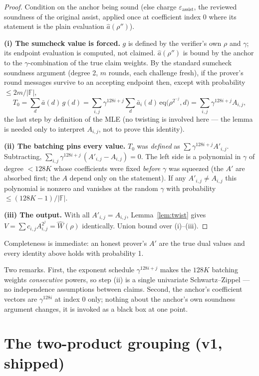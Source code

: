 \documentclass[11pt]{article}
\newcommand{\F}{\mathbb{F}}
\newcommand{\eq}{\mathrm{eq}}
\begin{document}
\begin{proof}
Condition on the anchor being sound (else charge
$\varepsilon_{\mathrm{assist}}$, the reviewed soundness of the original
assist, applied once at coefficient index $0$ where its statement is the
plain evaluation $\hat a(\rho'')$).

\textbf{(i) The sumcheck value is forced.} $g$ is defined by the verifier's
own $\rho$ and $\gamma$; its endpoint evaluation is computed, not claimed.
$\hat a(\rho'')$ is bound by the anchor to the $\gamma$-combination of the
true claim weights. By the standard sumcheck soundness argument (degree 2,
$m$ rounds, each challenge fresh), if the prover's round messages survive to
an accepting endpoint then, except with probability $\le 2m/|\F|$,
\[
  T_0 = \sum_d \bar a(d)\,g(d)
      = \sum_{i,j} \gamma^{128i+j} \sum_d \bar a_i(d)\,
        \eq\bigl(\rho^{2^{-j}},d\bigr)
      = \sum_{i,j} \gamma^{128i+j} A_{i,j},
\]
the last step by definition of the MLE (no twisting is involved here — the
lemma is needed only to interpret $A_{i,j}$, not to prove this identity).

\textbf{(ii) The batching pins every value.} $T_0$ was \emph{defined} as
$\sum \gamma^{128i+j} A'_{i,j}$. Subtracting, $\sum_{i,j}
\gamma^{128i+j}\,(A'_{i,j} - A_{i,j}) = 0$. The left side is a polynomial in
$\gamma$ of degree $< 128K$ whose coefficients were fixed \emph{before}
$\gamma$ was squeezed (the $A'$ are absorbed first; the $A$ depend only on
the statement). If any $A'_{i,j} \ne A_{i,j}$ this polynomial is nonzero
and vanishes at the random $\gamma$ with probability $\le (128K-1)/|\F|$.

\textbf{(iii) The output.} With all $A'_{i,j} = A_{i,j}$,
Lemma~\ref{lem:twist} gives $V = \sum c_{i,j} A_{i,j}^{2^j} = \widehat
W(\rho)$ identically. Union bound over (i)--(iii).
\end{proof}

Completeness is immediate: an honest prover's $A'$ are the true dual values
and every identity above holds with probability 1.

Two remarks. First, the exponent schedule $\gamma^{128i+j}$ makes the $128K$
batching weights \emph{consecutive} powers, so step (ii) is a single
univariate Schwartz--Zippel — no independence assumptions between claims.
Second, the anchor's coefficient vectors are $\gamma^{128i}$ at index $0$
only; nothing about the anchor's own soundness argument changes, it is
invoked as a black box at one point.

\section{The two-product grouping (v1, shipped)}
\end{document}
